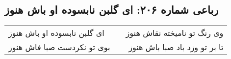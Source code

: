 \begin{center}
\section*{رباعی شماره ۲۰۶: ای گلبن نابسوده او باش هنوز}
\label{sec:sh206}
\begin{longtable}{l p{0.5cm} r}
ای گلبن نابسوده او باش هنوز
&&
وی رنگ تو نامیخته نقاش هنوز
\\
بوی تو نکردست صبا فاش هنوز
&&
تا بر تو وزد باد صبا باش هنوز
\\
\end{longtable}
\end{center}
